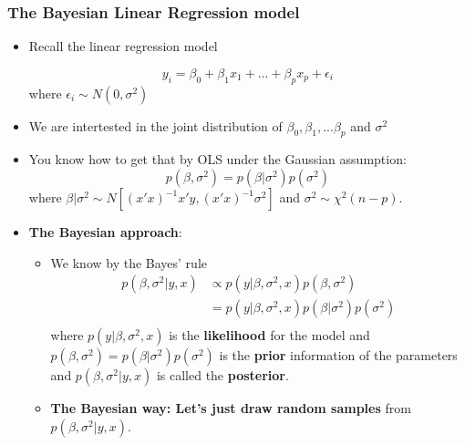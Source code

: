 \documentclass[10pt]{beamer}
\begin{document}
\begin{frame}
  \frametitle{The Bayesian Linear Regression model}

  \begin{itemize}
  \item Recall the linear regression model

    \begin{equation*}
      y_i = \beta_0 + \beta_1 x_1 + ... + \beta_p x_p + \epsilon_i
    \end{equation*}
    where $\epsilon_i \sim N(0, \sigma^2)$

  \item We are intertested in the joint distribution of
    $\beta_0,\beta_1,...\beta_p$ and $\sigma^2$

  \item You know how to get that by OLS under the Gaussian assumption:
    \begin{equation*}
      p(\beta,\sigma^2) = p(\beta|\sigma^2)p(\sigma^2)
    \end{equation*}
    where $\beta|\sigma^2 \sim N\left[
      (x'x)^{-1}x'y,(x'x)^{-1}\sigma^2\right]$ and $\sigma^2 \sim \chi^2(n-p)$.

  \item \textbf{The Bayesian approach}:

    \begin{itemize}
    \item We know by the Bayes' rule
      \begin{align*}
        p(\beta,\sigma^2|y,x) & \propto
                                p(y|\beta,\sigma^2,x)p(\beta,\sigma^2) \\
                              & =p(y|\beta,\sigma^2,x)p(\beta|\sigma^2)p(\sigma^2)\\
      \end{align*}
      where $p(y|\beta,\sigma^2,x)$ is the \textbf{likelihood} for the
      model and $p(\beta,\sigma^2) = p(\beta|\sigma^2)p(\sigma^2)$ is
      the \textbf{prior} information of the parameters and
      $p(\beta,\sigma^2|y,x)$ is called the \textbf{posterior}.

    \item \textbf{The Bayesian way: Let's just draw random samples}
      from $p(\beta,\sigma^2|y,x)$.

    \end{itemize}

  \end{itemize}

\end{frame}
\end{document}
